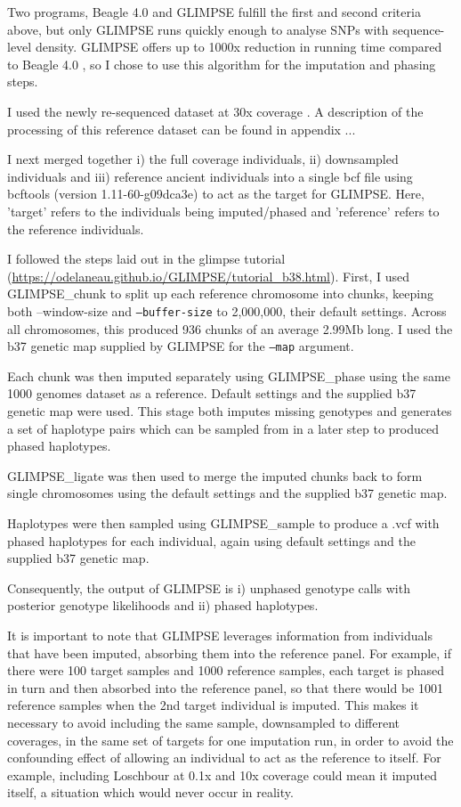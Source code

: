 Two programs, Beagle 4.0 \cite{Browning2007} and GLIMPSE \cite{rubinacci2021efficient} fulfill the first and second criteria above, but only GLIMPSE runs quickly enough to analyse SNPs with sequence-level density. GLIMPSE offers up to 1000x reduction in running time compared to Beagle 4.0 \cite{rubinacci2021efficient}, so I chose to use this algorithm for the imputation and phasing steps.   

I used the newly re-sequenced dataset at 30x coverage \cite{byrska2021high}. A description of the processing of this reference dataset can be found in appendix ...

I next merged together i) the full coverage individuals, ii) downsampled individuals and iii) reference ancient individuals into a single bcf file using bcftools (version 1.11-60-g09dca3e) \cite{li2011statistical} to act as the target for GLIMPSE. Here, 'target' refers to the individuals being imputed/phased and 'reference' refers to the reference individuals. 

I followed the steps laid out in the glimpse tutorial (\url{https://odelaneau.github.io/GLIMPSE/tutorial_b38.html}). First, I used GLIMPSE\_chunk to split up each reference chromosome into chunks, keeping both --window-size and \texttt{--buffer-size} to 2,000,000, their default settings. Across all chromosomes, this produced 936 chunks of an average 2.99Mb long. I used the b37 genetic map supplied by GLIMPSE for the \texttt{--map} argument. 

Each chunk was then imputed separately using GLIMPSE\_phase using the same 1000 genomes dataset as a reference. Default settings and the supplied b37 genetic map were used. This stage both imputes missing genotypes and generates a set of haplotype pairs which can be sampled from in a later step to produced phased haplotypes.

GLIMPSE\_ligate was then used to merge the imputed chunks back to form single chromosomes using the default settings and the supplied b37 genetic map. 

Haplotypes were then sampled using GLIMPSE\_sample to produce a .vcf with phased haplotypes for each individual, again using default settings and the supplied b37 genetic map. 

Consequently, the output of GLIMPSE is i) unphased genotype calls with posterior genotype likelihoods and ii) phased haplotypes.

It is important to note that GLIMPSE leverages information from individuals that have been imputed, absorbing them into the reference panel. For example, if there were 100 target samples and 1000 reference samples, each target is phased in turn and then absorbed into the reference panel, so that there would be 1001 reference samples when the 2nd target individual is imputed. This makes it necessary to avoid including the same sample, downsampled to different coverages, in the same set of targets for one imputation run, in order to avoid the confounding effect of allowing an individual to act as the reference to itself. For example, including Loschbour at 0.1x and 10x coverage could mean it imputed itself, a situation which would never occur in reality. 

